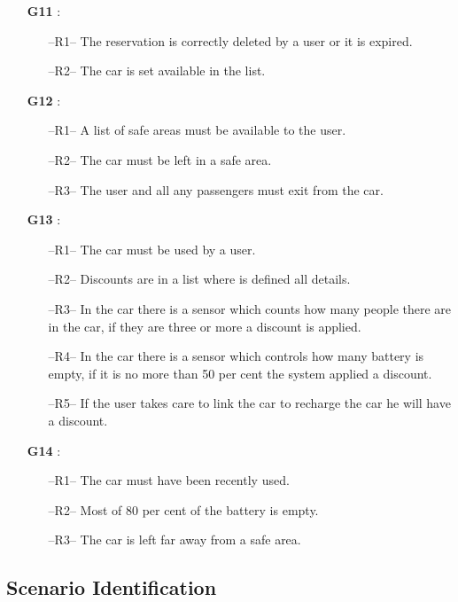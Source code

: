 \begin{itemize}
\item[\textbf{G11}]:
\begin{itemize}
\item[--R1--] The reservation is correctly deleted by a user or it is expired. 
\item[--R2--] The car is set available in the list.

\end{itemize}

\item[\textbf{G12}]:
\begin{itemize}
\item[--R1--] A list of safe areas must be available to the user.
\item[--R2--] The car must be left in a safe area.
\item[--R3--] The user and all any passengers must exit from the car.
\end{itemize}

\item[\textbf{G13}]:
\begin{itemize}
\item[--R1--] The car must be used by a user.
\item[--R2--] Discounts are in a list where is defined all details.
\item[--R3--] In the car there is a sensor which counts how many people there are in the car, if they are three or more a discount is applied.
\item[--R4--] In the car there is a sensor which controls how many battery is empty, if it is no more than 50 per cent the system applied a discount.
\item[--R5--] If the user takes care to link the car to recharge the car he will have a discount.
\end{itemize}

\item[\textbf{G14}]:
\begin{itemize}
\item[--R1--] The car must have been recently used.
\item[--R2--] Most of 80 per cent of the battery is empty.
\item[--R3--] The car is left far away from a safe area.
\end{itemize}
\end{itemize}

\subsection{Scenario Identification} \label{sec:scenarios}
